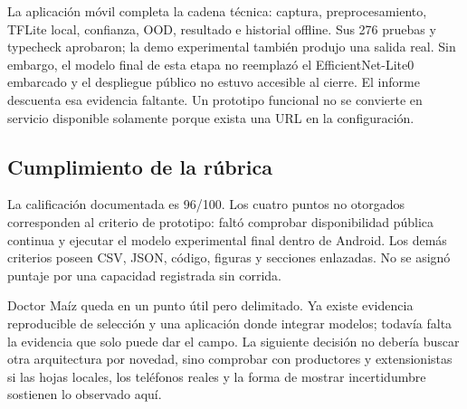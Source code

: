 La aplicación móvil completa la cadena técnica: captura, preprocesamiento,
TFLite local, confianza, OOD, resultado e historial offline. Sus 276 pruebas y
typecheck aprobaron; la demo experimental también produjo una salida real. Sin
embargo, el modelo final de esta etapa no reemplazó el EfficientNet-Lite0
embarcado y el despliegue público no estuvo accesible al cierre. El informe
descuenta esa evidencia faltante. Un prototipo funcional no se convierte en
servicio disponible solamente porque exista una URL en la configuración.

\subsection{Cumplimiento de la rúbrica}

La calificación documentada es 96/100. Los cuatro puntos no otorgados
corresponden al criterio de prototipo: faltó comprobar disponibilidad pública
continua y ejecutar el modelo experimental final dentro de Android. Los demás
criterios poseen CSV, JSON, código, figuras y secciones enlazadas. No se asignó
puntaje por una capacidad registrada sin corrida.

Doctor Maíz queda en un punto útil pero delimitado. Ya existe evidencia
reproducible de selección y una aplicación donde integrar modelos; todavía
falta la evidencia que solo puede dar el campo. La siguiente decisión no
debería buscar otra arquitectura por novedad, sino comprobar con productores y
extensionistas si las hojas locales, los teléfonos reales y la forma de mostrar
incertidumbre sostienen lo observado aquí.

\begin{table}[H]
  \centering
  \caption{Puntuación final respaldada por artefactos reproducibles.}
  \label{tab:rubric}
  \small
  
\end{table}
